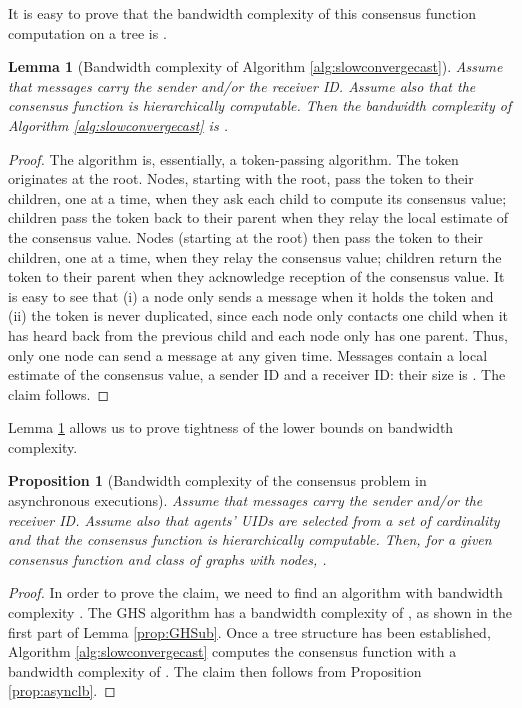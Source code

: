 \documentclass[letterpaper,10pt,conference]{ieeeconf}
\newtheorem{proposition}[theorem]{Proposition}
\newtheorem{lemma}[theorem]{Lemma}
\begin{document}
It is easy to prove that the bandwidth complexity of this consensus function computation on a tree is .
\begin{lemma}[Bandwidth complexity of Algorithm \ref{alg:slowconvergecast}]
\label{prop:ccfc}
Assume that messages carry the sender and/or the receiver ID. Assume also that the consensus function is hierarchically computable. Then the bandwidth complexity of Algorithm \ref{alg:slowconvergecast} is . 
\end{lemma}
\begin{proof}
The algorithm is, essentially, a token-passing algorithm. The token originates at the root. Nodes, starting with the root, pass the token to their children, one at a time, when they ask each child to compute its consensus value; children pass the token back to their parent when they relay the local estimate of the consensus value. Nodes (starting at the root) then pass the token to their children, one at a time, when they relay the consensus value; children return the token to their parent when they acknowledge reception of the consensus value. It is easy to see that (i) a node only sends a message when it holds the token and (ii) the token is never duplicated, since each node only contacts one child when it has heard back from the previous child and each node only has one parent. Thus, only one node can send a message at any given time. Messages contain a local estimate of the consensus value, a sender ID and a receiver ID: their size is . The claim follows.
\end{proof}

Lemma \ref{prop:ccfc} allows us to prove tightness of the lower bounds on bandwidth complexity.
\begin{proposition}[Bandwidth complexity of the consensus problem in asynchronous executions]
Assume that messages carry the sender and/or the receiver ID. Assume also that agents' UIDs are selected from a set  of cardinality  and that the consensus function is hierarchically computable. 
Then, for a given consensus function  and class of graphs  with  nodes,  .
\end{proposition}
\begin{proof}
In order to prove the claim, we need to find an algorithm with bandwidth complexity . The GHS algorithm has a bandwidth complexity of , as shown in the first part of Lemma \ref{prop:GHSub}. Once a tree structure has been established, Algorithm \ref{alg:slowconvergecast} computes the consensus function with a bandwidth complexity of . The claim then follows from Proposition \ref{prop:asynclb}.
\end{proof}
\end{document}
